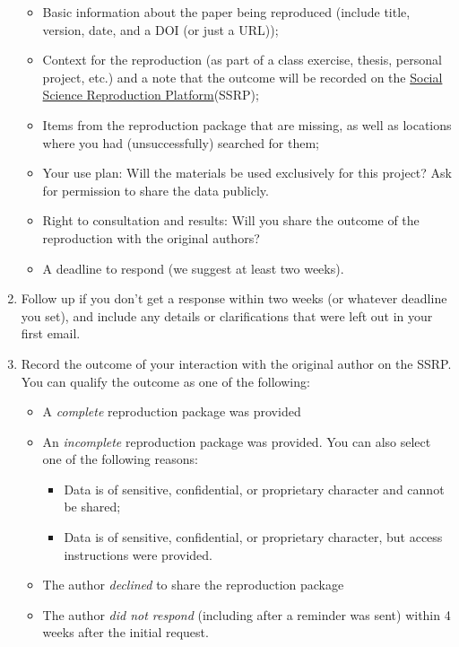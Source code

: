 \documentclass[
]{book}
\providecommand{\tightlist}{%
  \setlength{\itemsep}{0pt}\setlength{\parskip}{0pt}}
\begin{document}
\begin{enumerate}
  \begin{itemize}
  \tightlist
  \item
    Basic information about the paper being reproduced (include title, version, date, and a DOI (or just a URL));\\
  \item
    Context for the reproduction (as part of a class exercise, thesis, personal project, etc.) and a note that the outcome will be recorded on the \href{https://www.socialsciencereproduction.org/}{Social Science Reproduction Platform}(SSRP);
  \item
    Items from the reproduction package that are missing, as well as locations where you had (unsuccessfully) searched for them;\\
  \item
    Your use plan: Will the materials be used exclusively for this project? Ask for permission to share the data publicly.\\
  \item
    Right to consultation and results: Will you share the outcome of the reproduction with the original authors?\\
  \item
    A deadline to respond (we suggest at least two weeks).
  \end{itemize}
\item
  Follow up if you don't get a response within two weeks (or whatever deadline you set), and include any details or clarifications that were left out in your first email.
\item
  Record the outcome of your interaction with the original author on the SSRP. You can qualify the outcome as one of the following:

  \begin{itemize}
  \tightlist
  \item
    A \emph{complete} reproduction package was provided
  \item
    An \emph{incomplete} reproduction package was provided. You can also select one of the following reasons:

    \begin{itemize}
    \tightlist
    \item
      Data is of sensitive, confidential, or proprietary character and cannot be shared;
    \item
      Data is of sensitive, confidential, or proprietary character, but access instructions were provided.
    \end{itemize}
  \item
    The author \emph{declined} to share the reproduction package
  \item
    The author \emph{did not respond} (including after a reminder was sent) within 4 weeks after the initial request.
  \end{itemize}
\end{enumerate}
\end{document}
